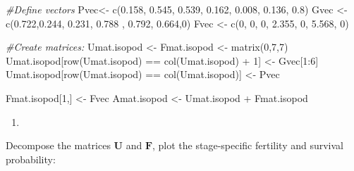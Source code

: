 \documentclass[
]{book}
\newenvironment{Shaded}{\begin{snugshade}}{\end{snugshade}}
\newcommand{\CommentTok}[1]{\textcolor[rgb]{0.56,0.35,0.01}{\textit{#1}}}
\newcommand{\DecValTok}[1]{\textcolor[rgb]{0.00,0.00,0.81}{#1}}
\newcommand{\FloatTok}[1]{\textcolor[rgb]{0.00,0.00,0.81}{#1}}
\newcommand{\FunctionTok}[1]{\textcolor[rgb]{0.00,0.00,0.00}{#1}}
\newcommand{\NormalTok}[1]{#1}
\newcommand{\OtherTok}[1]{\textcolor[rgb]{0.56,0.35,0.01}{#1}}
\newcommand{\SpecialCharTok}[1]{\textcolor[rgb]{0.00,0.00,0.00}{#1}}
\providecommand{\tightlist}{%
  \setlength{\itemsep}{0pt}\setlength{\parskip}{0pt}}
\begin{document}
\begin{Shaded}
\begin{Highlighting}[]
\CommentTok{\#Define vectors}
\NormalTok{Pvec}\OtherTok{\textless{}{-}} \FunctionTok{c}\NormalTok{(}\FloatTok{0.158}\NormalTok{, }\FloatTok{0.545}\NormalTok{, }\FloatTok{0.539}\NormalTok{, }\FloatTok{0.162}\NormalTok{, }\FloatTok{0.008}\NormalTok{, }\FloatTok{0.136}\NormalTok{, }\FloatTok{0.8}\NormalTok{)}
\NormalTok{Gvec }\OtherTok{\textless{}{-}} \FunctionTok{c}\NormalTok{(}\FloatTok{0.722}\NormalTok{,}\FloatTok{0.244}\NormalTok{, }\FloatTok{0.231}\NormalTok{, }\FloatTok{0.788}\NormalTok{ , }\FloatTok{0.792}\NormalTok{, }\FloatTok{0.664}\NormalTok{,}\DecValTok{0}\NormalTok{)}
\NormalTok{Fvec }\OtherTok{\textless{}{-}} \FunctionTok{c}\NormalTok{(}\DecValTok{0}\NormalTok{, }\DecValTok{0}\NormalTok{, }\DecValTok{0}\NormalTok{, }\FloatTok{2.355}\NormalTok{, }\DecValTok{0}\NormalTok{, }\FloatTok{5.568}\NormalTok{, }\DecValTok{0}\NormalTok{)}

\CommentTok{\#Create matrices:}
\NormalTok{Umat.isopod }\OtherTok{\textless{}{-}}\NormalTok{ Fmat.isopod }\OtherTok{\textless{}{-}} \FunctionTok{matrix}\NormalTok{(}\DecValTok{0}\NormalTok{,}\DecValTok{7}\NormalTok{,}\DecValTok{7}\NormalTok{)}
\NormalTok{Umat.isopod[}\FunctionTok{row}\NormalTok{(Umat.isopod) }\SpecialCharTok{==} \FunctionTok{col}\NormalTok{(Umat.isopod) }\SpecialCharTok{+} \DecValTok{1}\NormalTok{] }\OtherTok{\textless{}{-}}\NormalTok{ Gvec[}\DecValTok{1}\SpecialCharTok{:}\DecValTok{6}\NormalTok{]}
\NormalTok{Umat.isopod[}\FunctionTok{row}\NormalTok{(Umat.isopod) }\SpecialCharTok{==} \FunctionTok{col}\NormalTok{(Umat.isopod)] }\OtherTok{\textless{}{-}}\NormalTok{ Pvec}

\NormalTok{Fmat.isopod[}\DecValTok{1}\NormalTok{,] }\OtherTok{\textless{}{-}}\NormalTok{ Fvec}
\NormalTok{Amat.isopod }\OtherTok{\textless{}{-}}\NormalTok{ Umat.isopod }\SpecialCharTok{+}\NormalTok{ Fmat.isopod}
\end{Highlighting}
\end{Shaded}

\begin{enumerate}
\def\labelenumi{\arabic{enumi}.}
\setcounter{enumi}{1}
\tightlist
\item
\end{enumerate}

Decompose the matrices \(\mathbf{U}\) and \(\mathbf{F}\), plot the stage-specific fertility and survival probability:
\end{document}
